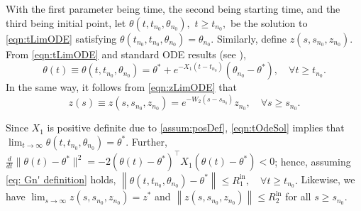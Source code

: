 \documentclass[usenames,dvipsnames,final,12pt]{colt2018} %
\newcommand{\Xt}{X_1}
\newcommand{\Rti}{R_1^{\textrm{in}}}
\newcommand{\thS}{\theta^*}
\newcommand{\bart}{\bar{\theta}}
\newcommand{\tSol}[1]{\theta(#1, \tI{n_0}, \theta_{n_0})}
\newcommand{\Ww}{W_2}
\newcommand{\Rzi}{R_2^{\textrm{in}}}
\newcommand{\barz}{\bar{z}}
\newcommand{\zSol}[1]{z(#1, \sI{n_0}, z_{n_0})}
\newcommand{\tI}[1]{t_{#1}}
\newcommand{\sI}[1]{s_{#1}}
\newcommand{\norm}[1]{\left\lVert#1\right\rVert}
\newcommand{\zS}{z^*}
\newcommand{\gal}[1]{#1}
\newcommand{\gugan}[1]{#1}
\begin{document}
\gugan{
With the first parameter being time, the second being starting time, and the third being initial point, let $\tSol{t},$ $t \geq \tI{n_0},$ be the solution to \eqref{eqn:tLimODE} satisfying $\tSol{\tI{n_0}} = \theta_{n_0}.$ Similarly, define $\zSol{s}.$
} From \eqref{eqn:tLimODE} and standard ODE results {(see \citep[p. 129]{hirsch2012differential})},
%
\begin{equation}
\label{eqn:tOdeSol}
\theta(t)\equiv
\tSol{t} = \thS + e^{-\Xt(t - \tI{n_0})} (\theta_{n_0} - \thS), \quad \forall t \geq \tI{n_0}.
\end{equation}
%
In the same way, it follows from \eqref{eqn:zLimODE} that
%
\begin{equation}
\label{eqn:zOdeSol}
z(s)
\equiv
\zSol{s} = e^{- \Ww (s - \sI{n_0})} z_{n_0}, \quad \forall s \geq \sI{n_0}.
\end{equation}

\gugan{
\begin{remark}
%
\label{rem:MonDec}
Since $\Xt$ is positive definite due to \ref{assum:posDef}, \eqref{eqn:tOdeSol} implies that $\lim_{t \to \infty} \tSol{t} = \thS.$ Further, $\frac{d}{dt}\|\theta(t) - \thS\|^2 = -2(\theta(t) - \thS)^\top \Xt (\theta(t) - \thS)<0$; hence, assuming \eqref{eq: Gn' definition} holds,
%
$
\norm{\tSol{t} - \thS} \leq \Rti, \quad \forall t \geq \tI{n_0}.
$
%
Likewise, we have $\lim_{s \to \infty} \zSol{s} = \zS$  and $\norm{\zSol{s}} \leq \Rzi$ for all $s \geq \sI{n_0}.$
%
\end{remark}
}


\end{document}
